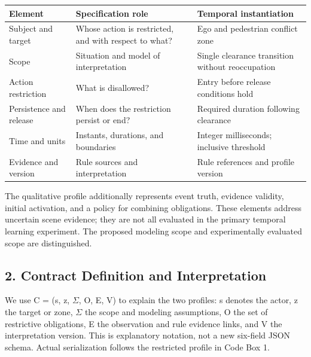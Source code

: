 \documentclass[11pt,a4paper]{article}
\begin{document}
\par\medskip\noindent\begin{minipage}{\linewidth}\small
\begin{tabular}{@{}>{\raggedright\arraybackslash}p{}>{\raggedright\arraybackslash}p{}>{\raggedright\arraybackslash}p{}@{}}
\toprule
\textbf{Element} & \textbf{Specification role} & \textbf{Temporal instantiation} \\
\midrule
Subject and target & Whose action is restricted, and with respect to what? & Ego and pedestrian conflict zone \\
Scope & Situation and model of interpretation & Single clearance transition without reoccupation \\
Action restriction & What is disallowed? & Entry before release conditions hold \\
Persistence and release & When does the restriction persist or end? & Required duration following clearance \\
Time and units & Instants, durations, and boundaries & Integer milliseconds; inclusive threshold \\
Evidence and version & Rule sources and interpretation & Rule references and profile version \\
\bottomrule\end{tabular}\end{minipage}\par\medskip

The qualitative profile additionally represents event truth, evidence validity, initial activation, and a policy for combining obligations. These elements address uncertain scene evidence; they are not all evaluated in the primary temporal learning experiment. The proposed modeling scope and experimentally evaluated scope are distinguished.\par

\subsection*{2. Contract Definition and Interpretation}

We use {\ttfamily\small C = (s, z, \ensuremath{\Sigma}, O, E, V)} to explain the two profiles: s denotes the actor, z the target or zone, \ensuremath{\Sigma} the scope and modeling assumptions, O the set of restrictive obligations, E the observation and rule evidence links, and V the interpretation version. This is explanatory notation, not a new six-field JSON schema. Actual serialization follows the restricted profile in Code Box 1.\par
\end{document}
